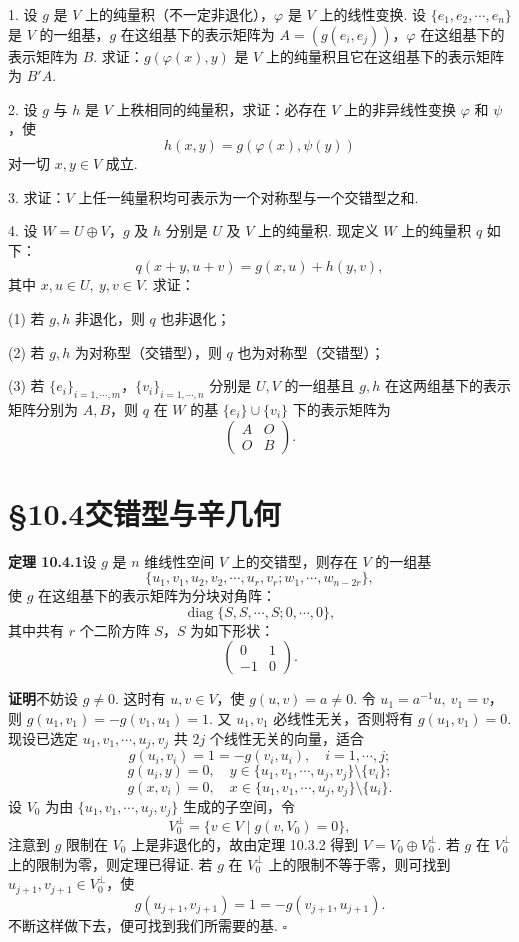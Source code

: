 \documentclass[UTF8, 12pt, fontset=fandol, oneside]{ctexart}
\begin{document}
1. 设 $g$ 是 $V$ 上的纯量积（不一定非退化），$\varphi$ 是 $V$ 上的线性变换. 设 $\{e_1,e_2,\cdots,e_n\}$ 是 $V$ 的一组基，$g$ 在这组基下的表示矩阵为 $A=(g(e_i,e_j))$，$\varphi$ 在这组基下的表示矩阵为 $B$. 求证：$g(\varphi(x),y)$ 是 $V$ 上的纯量积且它在这组基下的表示矩阵为 $B'A$.

2. 设 $g$ 与 $h$ 是 $V$ 上秩相同的纯量积，求证：必存在 $V$ 上的非异线性变换 $\varphi$ 和 $\psi$，使
\[
  h(x,y)=g(\varphi(x),\psi(y))
\]
对一切 $x,y\in V$ 成立.

3. 求证：$V$ 上任一纯量积均可表示为一个对称型与一个交错型之和.

4. 设 $W=U\oplus V$，$g$ 及 $h$ 分别是 $U$ 及 $V$ 上的纯量积. 现定义 $W$ 上的纯量积 $q$ 如下：
\[
  q(x+y,u+v)=g(x,u)+h(y,v),
\]
其中 $x,u\in U,\ y,v\in V$. 求证：

(1) 若 $g,h$ 非退化，则 $q$ 也非退化；

(2) 若 $g,h$ 为对称型（交错型），则 $q$ 也为对称型（交错型）；

(3) 若 $\{e_i\}_{i=1,\cdots,m}$，$\{v_i\}_{i=1,\cdots,n}$ 分别是 $U,V$ 的一组基且 $g,h$ 在这两组基下的表示矩阵分别为 $A,B$，则 $q$ 在 $W$ 的基 $\{e_i\}\cup\{v_i\}$ 下的表示矩阵为
\[
  \left(\begin{array}{cc}
  A&O\\
  O&B
  \end{array}\right).
\]

\section*{§10.4\quad 交错型与辛几何}

\noindent\textbf{定理 10.4.1}\quad 设 $g$ 是 $n$ 维线性空间 $V$ 上的交错型，则存在 $V$ 的一组基
\[
  \{u_1,v_1,u_2,v_2,\cdots,u_r,v_r;w_1,\cdots,w_{n-2r}\},
\]
使 $g$ 在这组基下的表示矩阵为分块对角阵：
\begin{equation}
  \operatorname{diag}\{S,S,\cdots,S;0,\cdots,0\},
  \tag{10.4.1}
\end{equation}
其中共有 $r$ 个二阶方阵 $S$，$S$ 为如下形状：
\[
  \left(\begin{array}{cc}
  0&1\\
  -1&0
  \end{array}\right).
\]

\noindent\textbf{证明}\quad 不妨设 $g\ne0$. 这时有 $u,v\in V$，使 $g(u,v)=a\ne0$. 令 $u_1=a^{-1}u,\ v_1=v$，则 $g(u_1,v_1)=-g(v_1,u_1)=1$. 又 $u_1,v_1$ 必线性无关，否则将有 $g(u_1,v_1)=0$. 现设已选定 $u_1,v_1,\cdots,u_j,v_j$ 共 $2j$ 个线性无关的向量，适合
\[
  g(u_i,v_i)=1=-g(v_i,u_i),\quad i=1,\cdots,j;
\]
\[
  g(u_i,y)=0,\quad y\in\{u_1,v_1,\cdots,u_j,v_j\}\setminus\{v_i\};
\]
\[
  g(x,v_i)=0,\quad x\in\{u_1,v_1,\cdots,u_j,v_j\}\setminus\{u_i\}.
\]
设 $V_0$ 为由 $\{u_1,v_1,\cdots,u_j,v_j\}$ 生成的子空间，令
\[
  V_0^\perp=\{v\in V\mid g(v,V_0)=0\},
\]
注意到 $g$ 限制在 $V_0$ 上是非退化的，故由定理 10.3.2 得到 $V=V_0\oplus V_0^\perp$. 若 $g$ 在 $V_0^\perp$ 上的限制为零，则定理已得证. 若 $g$ 在 $V_0^\perp$ 上的限制不等于零，则可找到 $u_{j+1},v_{j+1}\in V_0^\perp$，使
\[
  g(u_{j+1},v_{j+1})=1=-g(v_{j+1},u_{j+1}).
\]
不断这样做下去，便可找到我们所需要的基. $\square$
\end{document}
